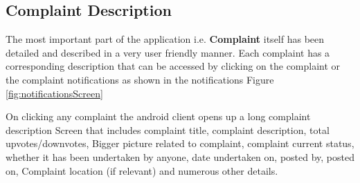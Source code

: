 \documentclass[12pt]{article}
\begin{document}
 \subsection{Complaint Description}
     \par The most important part of the application i.e. \textbf{Complaint} itself has been detailed and described in a very user friendly manner. Each complaint has a corresponding description that can be accessed by clicking on the complaint or the complaint notifications as shown in the notifications Figure \ref{fig:notificationsScreen} 
     \par On clicking any complaint the android client opens up a long complaint description Screen that includes complaint title, complaint description, total upvotes/downvotes, Bigger picture related to complaint, complaint current status, whether it has been undertaken by anyone, date undertaken on, posted by, posted on, Complaint location (if relevant) and numerous other details.  
     
\end{document}
